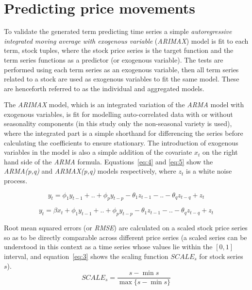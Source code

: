 \documentclass[conference,11pt]{IEEEtran}
\begin{document}
\section{Predicting price movements}
To validate the generated term predicting time series a simple \textit{autoregressive integrated moving average with exogenous variable} (\textit{ARIMAX}) model is fit to each term, stock tuples, where the stock price series is the target function and the term series functions as a predictor (or exogenous variable). The tests are performed using each term series as an exogenous variable, then all term series related to a stock are used as exogenous variables to fit the same model. These are henceforth referred to as the individual and aggregated models.

\par
The \textit{ARIMAX} model, which is an integrated variation of the \textit{ARMA} model with exogenous variables, is fit for modelling auto-correlated data with or without seasonality components (in this study only the non-seasonal variety is used), where the integrated part is a simple shorthand for differencing the series before calculating the coefficients to ensure stationary. The introduction of exogenous variables in the model is also a simple addition of the covariate \(x_t\) on the right hand side of the \textit{ARMA} formula. Equations~\ref{eq:4} and \ref{eq:5} show the \textit{ARMA(p,q)} and \textit{ARMAX(p,q)} models respectively, where \(z_t\) is a white noise process.

\begin{equation}
\label{eq:4}
y_t=\phi_1 y_{t-1} + .. + \phi_p y_{t-p} - 
\theta_1 z_{t-1} - .. - \theta_q z_{t-q} +
z_t
\end{equation}

\begin{equation}
\label{eq:5}
y_t=\beta x_t + \phi_1 y_{t-1} + .. + \phi_p y_{t-p} - 
\theta_1 z_{t-1} - .. - \theta_q z_{t-q} +
z_t
\end{equation}

\par
Root mean squared errors (or \textit{RMSE}) are calculated on a scaled stock price series so as to be directly comparable across different price series (a scaled series can be understood in this context as a time series whose values lie within the \([0,1]\) interval, and equation~\ref{eq:3} shows the scaling function \(SCALE_{s}\) for stock series \(s\)).
\begin{equation}
\label{eq:3}
SCALE_{s}=\frac{s-\min s}{\max \{s-\min s\}}
\end{equation}
\end{document}
